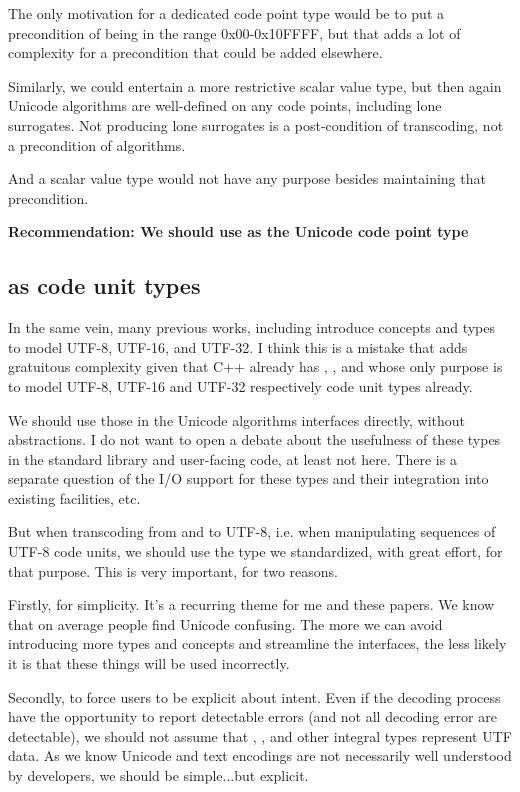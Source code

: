 \documentclass{wg21}
\begin{document}
The only motivation for a dedicated code point type would be to put a precondition of being in the range 0x00-0x10FFFF, but that adds a lot of complexity for a precondition that could be added elsewhere.

Similarly, we could entertain a more restrictive scalar value type, but then again Unicode algorithms are well-defined on any code points, including lone surrogates.
Not producing lone surrogates is a post-condition of transcoding, not a precondition of algorithms.

And a scalar value type would not have any purpose besides maintaining that precondition.

\textbf{Recommendation: We should use  as the Unicode code point type}

\subsection{ as code unit types}

In the same vein, many previous works, including  introduce concepts and types to model UTF-8, UTF-16, and UTF-32.
I think this is a mistake that adds gratuitous complexity given that C++ already has , , and  whose only purpose is to model UTF-8, UTF-16 and UTF-32 respectively code unit types already.

We should use those in the Unicode algorithms interfaces directly, without abstractions.
I do not want to open a debate about the usefulness of these types in the standard library and user-facing code, at least not here.
There is a separate question of the I/O support for these types and their integration into existing facilities, etc.

But when transcoding from and to UTF-8, i.e. when manipulating sequences of UTF-8 code units, we should use the type we standardized, with great effort, for that purpose.
This is very important, for two reasons.

Firstly, for simplicity. It's a recurring theme for me and these papers. We know that on average people find Unicode confusing. The more we can avoid introducing more types and concepts and streamline the interfaces, the less likely it is that these things will be used incorrectly.

Secondly, to force users to be explicit about intent. Even if the decoding process have the opportunity to report detectable errors (and not all decoding error are detectable), we should not assume that , ,  and other integral types represent UTF data. As we know Unicode and text encodings are not necessarily well understood by developers, we should be simple...but explicit.
\end{document}
